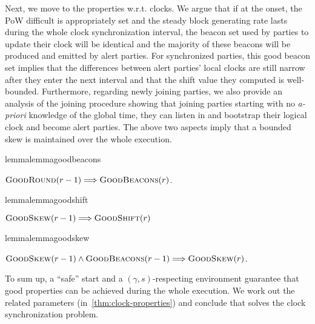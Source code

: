 Next, we move to the properties w.r.t. clocks.
%
We argue that if at the onset, the PoW difficult is appropriately set and the steady block generating rate lasts during the whole clock synchronization interval, the beacon set used by parties to update their clock will be identical and the majority of these beacons will be produced and emitted by alert parties.
%
For synchronized parties, this good beacon set implies that the differences between alert parties' local clocks are still narrow after they enter the next interval and that the shift value they computed is well-bounded.
%
Furthermore, regarding newly joining parties, we also provide an analysis of the joining procedure showing that joining parties starting with no \emph{a-priori} knowledge of the global time, they can listen in and bootstrap their logical clock and become alert parties.
%
The above two aspects imply that a bounded skew is maintained over the whole execution.

\begin{restatable*}{lemma}{lemmagoodbeacons}
    \label{lemma:goodbeacons}

    $\textsc{GoodRound}(r - 1) \Longrightarrow \textsc{GoodBeacons}(r)$.
\end{restatable*}

\begin{restatable*}{lemma}{lemmagoodshift}
    \label{lemma:goodshift}

    $\textsc{GoodSkew}(r - 1) \Longrightarrow \textsc{GoodShift}(r)$
\end{restatable*}

\begin{restatable*}{lemma}{lemmagoodskew}
    \label{lemma:goodskew}

    $\textsc{GoodSkew}(r - 1) \wedge \textsc{GoodBeacons}(r - 1) \Longrightarrow \textsc{GoodSkew}(r)$.
\end{restatable*}

To sum up, a ``safe'' start and a $(\gamma, s)$-respecting environment guarantee that good properties can be achieved during the whole execution.
%
We work out the related parameters (in~\cref{thm:clock-properties}) and conclude that \timekeeper solves the clock synchronization problem.
